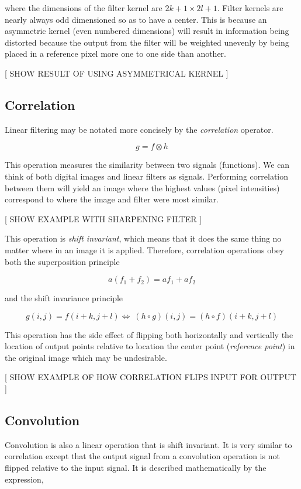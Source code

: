 where the dimensions of the filter kernel are $2k+1 \times 2l+1$. Filter kernels are nearly always odd dimensioned so as to have a center. This is because an asymmetric kernel (even numbered dimensions) will result in information being distorted because the output from the filter will be weighted unevenly by being placed in a reference pixel more one to one side than another.

[ SHOW RESULT OF USING ASYMMETRICAL KERNEL ] 



\subsection{Correlation}

Linear filtering may be notated more concisely by the \emph{correlation} operator.

\[g = f \otimes h\]

This operation measures the similarity between two signals (functions). We can think of both digital images and linear filters as signals. Performing correlation between them will yield an image where the highest values (pixel intensities) correspond to where the image and filter were most similar\cite{optimalKernel}.


[ SHOW EXAMPLE WITH SHARPENING FILTER ]

This operation is \emph{shift invariant}, which means that it does the same thing no matter where in an image it is applied. Therefore, correlation operations obey both the superposition principle

\[a(f_1 + f_2) = af_1 + af_2\]

and the shift invariance principle

\[g(i,j)=f(i+k,j+l) \Leftrightarrow\ (h\circ g)(i,j)=(h\circ f)(i+k,j+l)\]

This operation has the side effect of flipping both horizontally and vertically the location of output points relative to location the center point (\emph{reference point}) in the original image which may be undesirable.

[ SHOW EXAMPLE OF HOW CORRELATION FLIPS INPUT FOR OUTPUT ]

\subsection{Convolution}

Convolution is also a linear operation that is shift invariant. It is very similar to correlation except that the output signal from a convolution operation is not flipped relative to the input signal. It is described mathematically by the expression,

